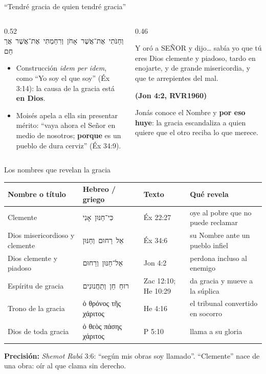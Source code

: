 \documentclass[hyperref={bookmarks=false},aspectratio=169]{beamer}
\newcommand{\heb}[1]{\mbox{\foreignlanguage{hebrew}{#1}}}
\newcommand{\grc}[1]{\foreignlanguage{ancientgreek}{#1}}
\newcommand{\SENOR}{S{\fontsize{0.78em}{1em}\selectfont EÑOR}}
\newcommand{\fuente}[1]{\par\hfill{\upshape\bfseries\footnotesize\textcolor{azul}{#1}}}
\newcommand{\destacar}[1]{\textbf{\textcolor{azul}{#1}}}
\newcommand{\precision}[1]{{\footnotesize\color{gris}\textbf{Precisión:} #1}}
\begin{document}
\begin{frame}{``Tendré gracia de quien tendré gracia''}
\begin{columns}[t,onlytextwidth]
\begin{column}{0.52\textwidth}
\centering\heb{וְחַנֹּתִי אֶת־אֲשֶׁר אָחֹן וְרִחַמְתִּי אֶת־אֲשֶׁר אֲרַחֵם}\par\medskip
\RaggedRight\small
\begin{itemize}
\item Construcción \emph{idem per idem}, como ``Yo soy el que soy'' (Éx 3:14): la causa de la gracia está \destacar{en Dios}.
\item Moisés apela a ella sin presentar mérito: ``vaya ahora el Señor en medio de nosotros; \destacar{porque} es un pueblo de dura cerviz'' (Éx 34:9).
\end{itemize}
\end{column}
\begin{column}{0.46\textwidth}
\begin{cita}Y oró a \SENOR{} y dijo\ldots{} sabía yo que tú eres Dios clemente y piadoso, tardo en enojarte, y de grande misericordia, y que te arrepientes del mal.\fuente{(Jon 4:2, RVR1960)}\end{cita}
\scriptsize Jonás conoce el Nombre y \destacar{por eso huye}: la gracia escandaliza a quien quiere que el otro reciba lo que merece.
\end{column}
\end{columns}
\end{frame}

\begin{frame}{Los nombres que revelan la gracia}
\scriptsize\renewcommand{\arraystretch}{1.18}
\begin{tabular}{@{}>{\RaggedRight\arraybackslash}p{2.7cm}>{\RaggedRight\arraybackslash}p{3.4cm}>{\RaggedRight\arraybackslash}p{1.9cm}>{\RaggedRight\arraybackslash}p{3.6cm}@{}}
\toprule
\textbf{Nombre o título} & \textbf{Hebreo / griego} & \textbf{Texto} & \textbf{Qué revela} \\ \midrule
Clemente & \heb{כִּי־חַנּוּן אָנִי} & Éx 22:27 & oye al pobre que no puede reclamar \\
Dios misericordioso y clemente & \heb{אֵל רַחוּם וְחַנּוּן} & Éx 34:6 & su Nombre ante un pueblo infiel \\
Dios clemente y piadoso & \heb{אֵל־חַנּוּן וְרַחוּם} & Jon 4:2 & perdona incluso al enemigo \\
Espíritu de gracia & \heb{רוּחַ חֵן וְתַחֲנוּנִים} & Zac 12:10; He 10:29 & da gracia y mueve a la súplica \\
Trono de la gracia & \grc{ὁ θρόνος τῆς χάριτος} & He 4:16 & el tribunal convertido en socorro \\
Dios de toda gracia & \grc{ὁ θεὸς πάσης χάριτος} & 1 P 5:10 & llama a su gloria \\
\bottomrule
\end{tabular}\par\medskip
\precision{\emph{Shemot Rabá} 3:6: ``según mis obras soy llamado''. ``Clemente'' nace de una obra: oír al que clama sin derecho.}
\end{frame}
\end{document}
